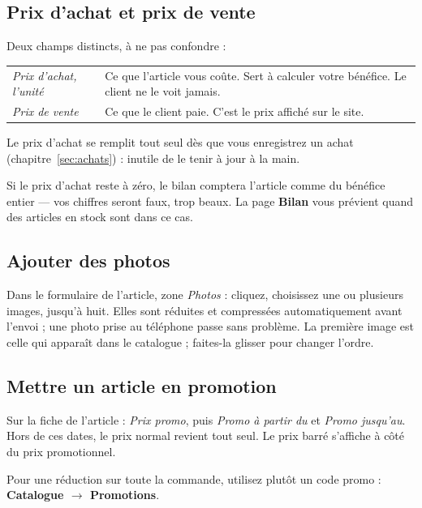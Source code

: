 \documentclass[11pt,a4paper]{article}
\newcommand{\menu}[1]{\textsf{\textbf{#1}}}
\newcommand{\champ}[1]{\textit{#1}}
\begin{document}
\subsection{Prix d'achat et prix de vente}

Deux champs distincts, à ne pas confondre :

\begin{center}
\begin{tabularx}{\textwidth}{@{}lX@{}}
\toprule
\champ{Prix d'achat, l'unité} & Ce que l'article vous coûte. Sert à calculer votre bénéfice. Le client ne le voit jamais. \\
\champ{Prix de vente} & Ce que le client paie. C'est le prix affiché sur le site. \\
\bottomrule
\end{tabularx}
\end{center}

Le prix d'achat se remplit tout seul dès que vous enregistrez un achat
(chapitre~\ref{sec:achats}) : inutile de le tenir à jour à la main.

\begin{attention}
Si le prix d'achat reste à zéro, le bilan comptera l'article comme du bénéfice
entier — vos chiffres seront faux, trop beaux. La page \menu{Bilan} vous
prévient quand des articles en stock sont dans ce cas.
\end{attention}

\subsection{Ajouter des photos}

Dans le formulaire de l'article, zone \champ{Photos} : cliquez, choisissez une
ou plusieurs images, jusqu'à huit. Elles sont réduites et compressées
automatiquement avant l'envoi ; une photo prise au téléphone passe sans
problème. La première image est celle qui apparaît dans le catalogue ;
faites-la glisser pour changer l'ordre.

\subsection{Mettre un article en promotion}

Sur la fiche de l'article : \champ{Prix promo}, puis \champ{Promo à partir du}
et \champ{Promo jusqu'au}. Hors de ces dates, le prix normal revient tout seul.
Le prix barré s'affiche à côté du prix promotionnel.

Pour une réduction sur toute la commande, utilisez plutôt un code promo :
\menu{Catalogue $\rightarrow$ Promotions}.
\end{document}
